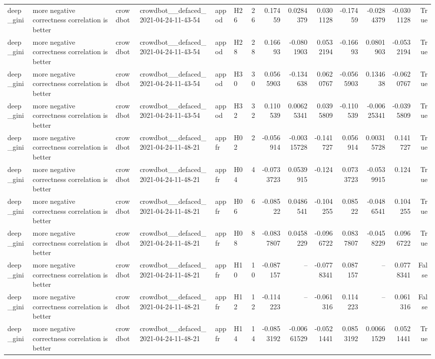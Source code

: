 \begin{longtable}{llllllrrrrrrrr}
deep\_gini & more negative correctness correlation is better & crowdbot & crowdbot\_\_defaced\_2021-04-24-11-43-54 & appod & H26 & 26 & 0.17459 & 0.0284379 & 0.0301128 & -0.17459 & -0.0284379 & -0.0301128 & True \\
deep\_gini & more negative correctness correlation is better & crowdbot & crowdbot\_\_defaced\_2021-04-24-11-43-54 & appod & H28 & 28 & 0.16693 & -0.0801903 & 0.0532194 & -0.16693 & 0.0801903 & -0.0532194 & True \\
deep\_gini & more negative correctness correlation is better & crowdbot & crowdbot\_\_defaced\_2021-04-24-11-43-54 & appod & H30 & 30 & 0.0565903 & -0.134638 & 0.0620767 & -0.0565903 & 0.134638 & -0.0620767 & True \\
deep\_gini & more negative correctness correlation is better & crowdbot & crowdbot\_\_defaced\_2021-04-24-11-43-54 & appod & H32 & 32 & 0.110539 & 0.00625341 & 0.0395809 & -0.110539 & -0.00625341 & -0.0395809 & True \\
deep\_gini & more negative correctness correlation is better & crowdbot & crowdbot\_\_defaced\_2021-04-24-11-48-21 & appfr & H02 & 2 & -0.056914 & -0.00315728 & -0.141727 & 0.056914 & 0.00315728 & 0.141727 & True \\
deep\_gini & more negative correctness correlation is better & crowdbot & crowdbot\_\_defaced\_2021-04-24-11-48-21 & appfr & H04 & 4 & -0.0733723 & 0.0539915 & -0.124 & 0.0733723 & -0.0539915 & 0.124 & True \\
deep\_gini & more negative correctness correlation is better & crowdbot & crowdbot\_\_defaced\_2021-04-24-11-48-21 & appfr & H06 & 6 & -0.08522 & 0.0486541 & -0.104255 & 0.08522 & -0.0486541 & 0.104255 & True \\
deep\_gini & more negative correctness correlation is better & crowdbot & crowdbot\_\_defaced\_2021-04-24-11-48-21 & appfr & H08 & 8 & -0.0837807 & 0.0458229 & -0.0966722 & 0.0837807 & -0.0458229 & 0.0966722 & True \\
deep\_gini & more negative correctness correlation is better & crowdbot & crowdbot\_\_defaced\_2021-04-24-11-48-21 & appfr & H10 & 10 & -0.087157 & -- & -0.0778341 & 0.087157 & -- & 0.0778341 & False \\
deep\_gini & more negative correctness correlation is better & crowdbot & crowdbot\_\_defaced\_2021-04-24-11-48-21 & appfr & H12 & 12 & -0.114223 & -- & -0.061316 & 0.114223 & -- & 0.061316 & False \\
deep\_gini & more negative correctness correlation is better & crowdbot & crowdbot\_\_defaced\_2021-04-24-11-48-21 & appfr & H14 & 14 & -0.0853192 & -0.00661529 & -0.0521441 & 0.0853192 & 0.00661529 & 0.0521441 & True \\

\end{longtable}
